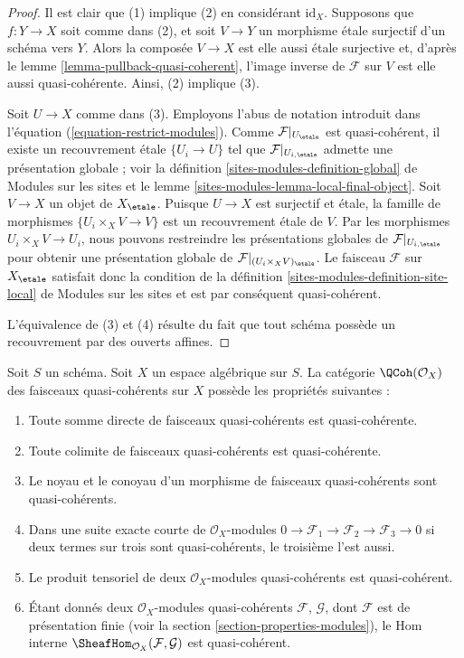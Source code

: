 \begin{proof}
Il est clair que (1) implique (2) en considérant $\text{id}_X$.
Supposons que $f : Y \to X$ soit comme dans (2), et soit $V \to Y$ un morphisme
\'etale surjectif d'un schéma vers $Y$. Alors la composée $V \to X$ est elle aussi
\'etale surjective
et, d'après le lemme \ref{lemma-pullback-quasi-coherent}, l'image inverse de $\mathcal{F}$
sur $V$ est elle aussi quasi-cohérente. Ainsi, (2) implique (3).

\medskip\noindent
Soit $U \to X$ comme dans (3). Employons l'abus de notation introduit
dans l'équation (\ref{equation-restrict-modules}).
Comme $\mathcal{F}|_{U_\etale}$ est quasi-cohérent, il existe un
recouvrement \'etale $\{U_i \to U\}$ tel que
$\mathcal{F}|_{U_{i, \etale}}$ admette une présentation globale ; voir la
définition \ref{sites-modules-definition-global} de Modules sur les sites et le
lemme \ref{sites-modules-lemma-local-final-object}.
Soit $V \to X$ un objet de $X_\etale$. Puisque $U \to X$ est
surjectif et \'etale, la famille de morphismes $\{U_i \times_X V \to V\}$ est un
recouvrement \'etale
de $V$. Par les morphismes $U_i \times_X V \to U_i$, nous pouvons restreindre les
présentations globales de $\mathcal{F}|_{U_{i, \etale}}$ pour obtenir une présentation
globale de $\mathcal{F}|_{(U_i \times_X V)_\etale}$.
Le faisceau $\mathcal{F}$ sur $X_\etale$ satisfait donc la condition de la
définition \ref{sites-modules-definition-site-local} de Modules sur les sites
et est par conséquent quasi-cohérent.

\medskip\noindent
L'équivalence de (3) et (4) résulte du fait que tout schéma possède
un recouvrement par des ouverts affines.
\end{proof}

\begin{lemma}
\label{lemma-properties-quasi-coherent}
Soit $S$ un schéma. Soit $X$ un espace algébrique sur $S$.
La catégorie $\QCoh(\mathcal{O}_X)$ des faisceaux quasi-cohérents sur $X$
possède les propriétés suivantes :
\begin{enumerate}
\item Toute somme directe de faisceaux quasi-cohérents est quasi-cohérente.
\item Toute colimite de faisceaux quasi-cohérents est quasi-cohérente.
\item Le noyau et le conoyau d'un morphisme de faisceaux quasi-cohérents
sont quasi-cohérents.
\item Dans une suite exacte courte de $\mathcal{O}_X$-modules
$0 \to \mathcal{F}_1 \to \mathcal{F}_2 \to \mathcal{F}_3 \to 0$
si deux termes sur trois sont quasi-cohérents, le troisième l'est aussi.
\item Le produit tensoriel de deux $\mathcal{O}_X$-modules quasi-cohérents
est quasi-cohérent.
\item Étant donnés deux $\mathcal{O}_X$-modules quasi-cohérents
$\mathcal{F}$, $\mathcal{G}$, dont $\mathcal{F}$
est de présentation finie (voir la
section \ref{section-properties-modules}),
le Hom interne
$\SheafHom_{\mathcal{O}_X}(\mathcal{F}, \mathcal{G})$
est quasi-cohérent.
\end{enumerate}
\end{lemma}

